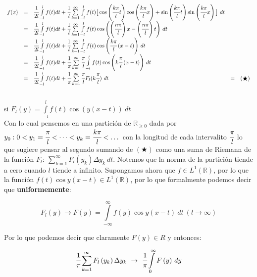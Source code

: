 \documentclass[a4paper,spanish]{article}
\def\R {\mathbb{R}}
\numberwithin{equation}{section}
\begin{document}
\[
\begin{array}{rclll}

f(x) & = & \cfrac{1}{2l} \int \limits_{-l}^{l}{f(t)} dt + \cfrac{1}{l} \sum \limits_{k=1}^{\infty}{\int \limits_{-l}^{l}{f(t) \big[ \cos \left({\cfrac{k\pi}{l} t} \right) \cos \left({\cfrac{k\pi}{l} x} \right) + \sin \left({\cfrac{k\pi}{l} t}\right) \sin \left( {\cfrac{k\pi}{l} x} \right) \big] } \ dt} & & \\
& = & \cfrac{1}{2l} \int \limits_{-l}^{l}{f(t)} dt + \cfrac{1}{l} \sum \limits_{k=1}^{\infty}{\int \limits_{-l}^{l}{f(t)\cos\left({\left({\cfrac{n\pi}{l}}\right)x - \left({\cfrac{n\pi}{l}}\right)t}\right)}} \ dt & & \\
& = & \cfrac{1}{2l} \int \limits_{-l}^{l}{f(t)} dt + \cfrac{1}{l} \sum \limits_{k=1}^{\infty}{\int \limits_{-l}^{l}{f(t)\cos\left({\cfrac{k\pi}{l}\left({x-t}\right)}\right)}} \ dt & & \\
& = & \cfrac{1}{2l} \int \limits_{-l}^{l}{f(t)} dt + \cfrac{1}{\pi} \sum \limits_{k=1}^{\infty}{\cfrac{\pi}{l} \int \limits_{-l}^{l}{f(t)\cos\left({k \cfrac{\pi}{l}\left({x-t}\right)}\right)}} \ dt & & \\
& = & \cfrac{1}{2l} \int \limits_{-l}^{l}{f(t)} dt + \cfrac{1}{\pi} \sum \limits_{k=1}^{\infty}{\cfrac{\pi}{l} F_l (k \cfrac{\pi}{l})} \ dt & = & (\bigstar)
\end{array}
\]
\\
si $F_l (y) = \int\limits_{-l}^{l}{f(t)\cos\left({y\left({x-t}\right)}\right)} \ dt$
\\
Con lo cual pensemos en una partici\'on de $\R_{\geq 0}$ dada por $y_0:0 < y_1=\cfrac{\pi}{l}<\dots<y_k=\cfrac{k\pi}{l}< \dots $ con la longitud de cada intervalito $\cfrac{\pi}{l}$ lo que sugiere pensar al segundo sumando de $(\bigstar)$ como una suma de Riemann de la funci\'on $F_l: \ \sum \limits_{k=1}^{\infty}{F_l \left(y_k\right) \Delta y_k} \ dt $. Notemos que la norma de la partici\'on tiende a cero cuando $l$ tiende a infinito. Supongamos ahora que $f \in L^1(\R)$, por lo que la funci\'on $f(t)\cos{y\left(x-t\right)} \in L^1(\R)$, por lo que formalmente podemos decir que \textbf{uniformemente}:

\[F_l(y) \rightarrow F(y)=\int\limits_{-\infty}^{\infty}{f(y)\cos{y(x-t)}} \ dt \ (l \rightarrow \infty)\]

Por lo que podemos decir que claramente $F(y) \in R$ y entonces:

\[\cfrac{1}{\pi} \sum\limits_{k=1}^{\infty}{F_l\left({y_k}\right)\Delta y_k} \ \rightarrow \ \cfrac{1}{\pi}\int\limits_{0}^{\infty}{F\left(y\right)} \ dy \]
\end{document}
